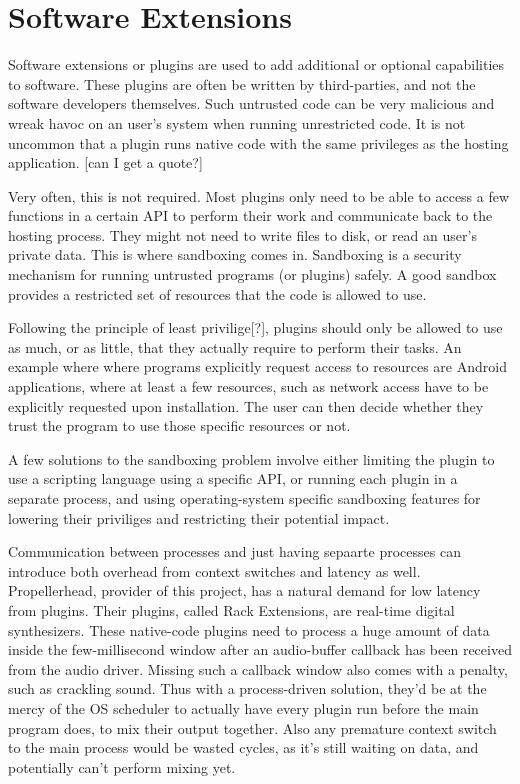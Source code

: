 \chapter {Software Extensions}

Software extensions or plugins are used to add additional or optional
capabilities to software. These plugins are often be written by third-parties,
and not the software developers themselves. Such untrusted code can be very
malicious and wreak havoc on an user's system when running unrestricted code. It
is not uncommon that a plugin runs native code with the same privileges as the
hosting application. [can I get a quote?]

Very often, this is not required. Most plugins only need to be able to access
a few functions in a certain API to perform their work and communicate back to
the hosting process. They might not need to write files to disk, or read an
user's private data. This is where sandboxing comes in. Sandboxing is a security
mechanism for running untrusted programs (or plugins) safely. A good sandbox
provides a restricted set of resources that the code is allowed to use.

Following the principle of least privilige[?], plugins should only be allowed to
use as much, or as little, that they actually require to perform their tasks.
An example where where programs explicitly request access to resources are
Android applications, where at least a few resources, such as network access
have to be explicitly requested upon installation. The user can then decide
whether they trust the program to use those specific resources or not.

A few solutions to the sandboxing problem involve either limiting the plugin to
use a scripting language using a specific API, or running each plugin in a
separate process, and using operating-system specific sandboxing features for
lowering their priviliges and restricting their potential impact.

Communication between processes and just having sepaarte processes can introduce
both overhead from context switches and latency as well. Propellerhead,
provider of this project, has a natural demand for low latency from plugins.
Their plugins, called Rack Extensions, are real-time digital synthesizers. These
native-code plugins need to process a huge amount of data inside the
few-millisecond window after an audio-buffer callback has been received from the
audio driver. Missing such a callback window also comes with a penalty, such as
crackling sound. Thus with a process-driven solution, they'd be at the mercy of
the OS scheduler to actually have every plugin run before the main program does,
to mix their output together. Also any premature context switch to the main
process would be wasted cycles, as it's still waiting on data, and potentially
can't perform mixing yet.

